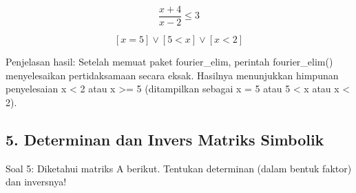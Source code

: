 \documentclass{article}
\newenvironment{eulernotebook}{\par}{\par}
\newcommand{\eulersubheading}[1]{\subsection{#1}}
\newenvironment{eulercomment}{\par\medskip}{\par\medskip}
\newenvironment{eulerformula}{}{}
\begin{document}
\begin{eulernotebook}
\begin{eulercomment}
\begin{eulercomment}
\begin{eulercomment}
\begin{eulercomment}
\begin{eulercomment}
\begin{eulercomment}
\begin{eulercomment}
\begin{eulercomment}
\begin{eulercomment}
\begin{eulercomment}
\begin{eulercomment}
\end{eulercomment}
\begin{eulerformula}
\[
\frac{x + 4}{x - 2} \le 3
\]
\end{eulerformula}
\begin{eulercomment}
\end{eulercomment}
\begin{eulerformula}
\[
\left[ x=5 \right] \lor \left[ 5<x \right] \lor \left[ x<2 \right] 
\]
\end{eulerformula}
\begin{eulercomment}
Penjelasan hasil: Setelah memuat paket fourier\_elim, perintah
fourier\_elim() menyelesaikan pertidaksamaan secara eksak. Hasilnya
menunjukkan himpunan penyelesaian x \textless{} 2 atau x \textgreater{}= 5 (ditampilkan
sebagai x = 5 atau 5 \textless{} x atau x \textless{} 2).

\end{eulercomment}
\eulersubheading{5. Determinan dan Invers Matriks Simbolik}
\begin{eulercomment}
Soal 5: Diketahui matriks A berikut. Tentukan determinan (dalam bentuk
faktor) dan inversnya!


\end{eulercomment}
\end{eulercomment}
\end{eulercomment}
\end{eulercomment}
\end{eulercomment}
\end{eulercomment}
\end{eulercomment}
\end{eulercomment}
\end{eulercomment}
\end{eulercomment}
\end{eulercomment}
\end{eulernotebook}
\end{document}
